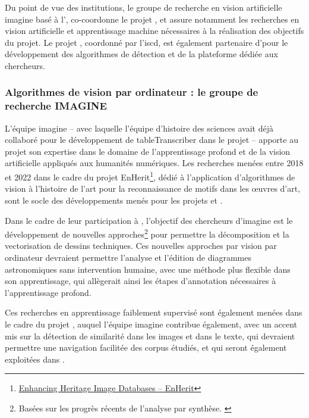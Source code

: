 Du point de vue des institutions, le groupe de recherche en vision artificielle \acrfull{imagine} basé à l'\ponts, co-coordonne le projet \eida, et assure notamment les recherches en vision artificielle et apprentissage machine nécessaires à la réalisation des objectifs du projet. Le projet \vhs, coordonné par l'\acrlong{iscd}, est également partenaire d'\eida pour le développement des algorithmes de détection et de la plateforme dédiée aux chercheurs.

        \subsubsection{Algorithmes de vision par ordinateur : le groupe de recherche IMAGINE}
L'équipe \acrshort{imagine} -- avec laquelle l'équipe d'histoire des sciences avait déjà collaboré pour le développement de tableTranscriber dans le projet \dishas -- apporte au projet \eida son expertise dans le domaine de l'apprentissage profond et de la vision artificielle appliqués aux humanités numériques. Les recherches menées entre 2018 et 2022 dans le cadre du projet EnHerit\footnote{\href{https://anr.fr/Project-ANR-17-CE23-0008}{Enhancing Heritage Image Databases – EnHerit}}, dédié à l'application d'algorithmes de vision à l'histoire de l'art pour la reconnaissance de motifs dans les œuvres d'art, sont le socle des développements menés pour les projets \eida et \vhs. 

Dans le cadre de leur participation à \eida, l'objectif des chercheurs d'\acrshort{imagine} est le développement de nouvelles approches\footnote{Basées sur les progrès récents de l'analyse par synthèse. \cite{monnierUnsupervisedLayeredImage2021}} pour permettre la décomposition et la vectorisation de dessins techniques. Ces nouvelles approches par vision par ordinateur devraient permettre l'analyse et l'édition de diagrammes astronomiques sans intervention humaine, avec une méthode plus flexible dans son apprentissage, qui allègerait ainsi les étapes d'annotation nécessaires à l'apprentissage profond.

Ces recherches en apprentissage faiblement supervisé sont également menées dans le cadre du projet \vhs, auquel l'équipe \acrshort{imagine} contribue également, avec un accent mis sur la détection de similarité dans les images et dans le texte, qui devraient permettre une navigation facilitée des corpus étudiés, et qui seront également exploitées dans \eida.


